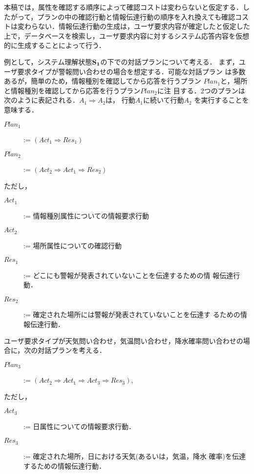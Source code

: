 本稿では，属性を確認する順序によって確認コストは変わらないと仮定する．し
たがって，プランの中の確認行動と情報伝達行動の順序を入れ換えても確認コス
トは変わらない．情報伝達行動の生成は，ユーザ要求内容が確定したと仮定した
上で，データベースを検索し，ユーザ要求内容に対するシステム応答内容を仮想
的に生成することによって行う．

例として，システム理解状態${\bf S_{1}}$の下での対話プランについて考える．
まず，ユーザ要求タイプが警報問い合わせの場合を想定する．可能な対話プラン
は多数あるが，簡単のため，情報種別を確認してから応答を行うプラン
$Plan_{1}$と，場所と情報種別を確認してから応答を行うプラン$Plan_{2}$に注
目する．2つのプランは次のように表記される．$A_{1} \Rightarrow A_{2}$は，
行動$A_{1}$に続いて行動$A_{2}$ を実行することを意味する．

\begin{description}
\item[$Plan_{1}$] := $(Act_{1} \Rightarrow Res_{1})$
\item[$Plan_{2}$] := $(Act_{2} \Rightarrow Act_{1} \Rightarrow Res_{2})$
\end{description}

\noindent ただし，
\begin{description}
\item[$Act_{1}$] := 情報種別属性についての情報要求行動
\item[$Act_{2}$] := 場所属性についての確認行動
\item[$Res_{1}$] := どこにも警報が発表されていないことを伝達するための情
報伝達行動．
\item[$Res_{2}$] := 確定された場所には警報が発表されていないことを伝達す
るための情報伝達行動．
\end{description}

ユーザ要求タイプが天気問い合わせ，気温問い合わせ，降水確率問い合わせの場
合に，次の対話プランを考える．

\begin{description}
\item[$Plan_{3}$] := $(Act_{2} \Rightarrow Act_{1} \Rightarrow Act_{3} \Rightarrow
Res_{3})$,
\end{description}

\noindent ただし，
\begin{description}
\item[$Act_{3}$] := 日属性についての情報要求行動．
\item[$Res_{3}$] := 確定された場所，日における天気(あるいは，気温，降水
確率)を伝達するための情報伝達行動．
\end{description}

